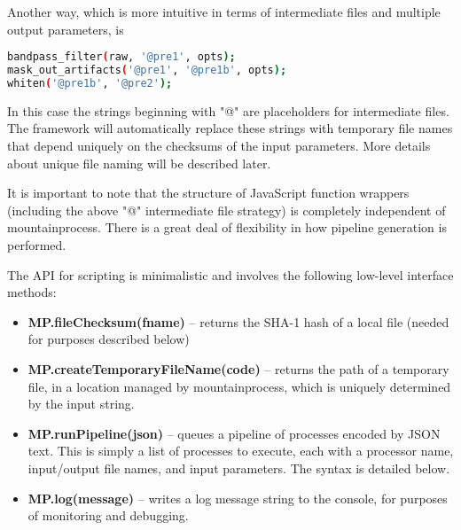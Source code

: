 \documentclass{article}
\begin{document}
Another way, which is more intuitive in terms of intermediate files and multiple output parameters, is
\begin{lstlisting}[language=bash]
bandpass_filter(raw, '@pre1', opts);
mask_out_artifacts('@pre1', '@pre1b', opts);
whiten('@pre1b', '@pre2');
\end{lstlisting}
In this case the strings beginning with "@" are placeholders for intermediate files. The framework will automatically replace these strings with temporary file names that depend uniquely on the checksums of the input parameters. More details about unique file naming will be described later.

It is important to note that the structure of JavaScript function wrappers (including the above "@" intermediate file strategy) is completely independent of mountainprocess. There is a great deal of flexibility in how pipeline generation is performed.

The API for scripting is minimalistic and involves the following low-level interface methods:
\begin{itemize}
\item{\textbf{MP.fileChecksum(fname)} -- returns the SHA-1 hash of a local file (needed for purposes described below)}
\item{\textbf{MP.createTemporaryFileName(code)} -- returns the path of a temporary file, in a location managed by mountainprocess, which is uniquely determined by the input string.}
\item{\textbf{MP.runPipeline(json)} -- queues a pipeline of processes encoded by JSON text. This is simply a list of processes to execute, each with a processor name, input/output file names, and input parameters. The syntax is detailed below.}
\item{\textbf{MP.log(message)} -- writes a log message string to the console, for purposes of monitoring and debugging.}

\end{itemize}

\subsection{}
\end{document}
